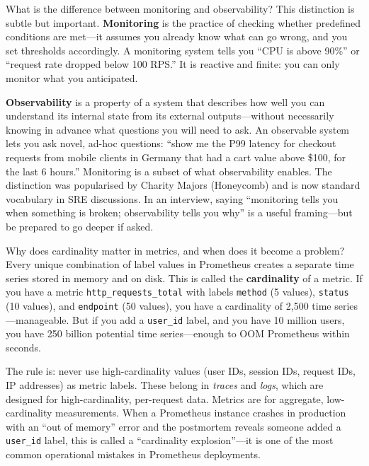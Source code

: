 \documentclass[11pt,a4paper]{article}
\begin{document}
\begin{curiobox}{What is the difference between monitoring and observability?}
  This distinction is subtle but important. \textbf{Monitoring} is the practice of checking whether predefined conditions are met---it assumes you already know what can go wrong, and you set thresholds accordingly. A monitoring system tells you ``CPU is above 90\%'' or ``request rate dropped below 100 RPS.'' It is reactive and finite: you can only monitor what you anticipated.

  \textbf{Observability} is a property of a system that describes how well you can understand its internal state from its external outputs---without necessarily knowing in advance what questions you will need to ask. An observable system lets you ask novel, ad-hoc questions: ``show me the P99 latency for checkout requests from mobile clients in Germany that had a cart value above \$100, for the last 6 hours.'' Monitoring is a subset of what observability enables. The distinction was popularised by Charity Majors (Honeycomb) and is now standard vocabulary in SRE discussions. In an interview, saying ``monitoring tells you when something is broken; observability tells you why'' is a useful framing---but be prepared to go deeper if asked.
\end{curiobox}

\begin{curiobox}{Why does cardinality matter in metrics, and when does it become a problem?}
  Every unique combination of label values in Prometheus creates a separate time series stored in memory and on disk. This is called the \textbf{cardinality} of a metric. If you have a metric \texttt{http\_requests\_total} with labels \texttt{method} (5 values), \texttt{status} (10 values), and \texttt{endpoint} (50 values), you have a cardinality of 2,500 time series---manageable. But if you add a \texttt{user\_id} label, and you have 10 million users, you have 250 billion potential time series---enough to OOM Prometheus within seconds.

  The rule is: never use high-cardinality values (user IDs, session IDs, request IDs, IP addresses) as metric labels. These belong in \emph{traces} and \emph{logs}, which are designed for high-cardinality, per-request data. Metrics are for aggregate, low-cardinality measurements. When a Prometheus instance crashes in production with an ``out of memory'' error and the postmortem reveals someone added a \texttt{user\_id} label, this is called a ``cardinality explosion''---it is one of the most common operational mistakes in Prometheus deployments.
\end{curiobox}
\end{document}
